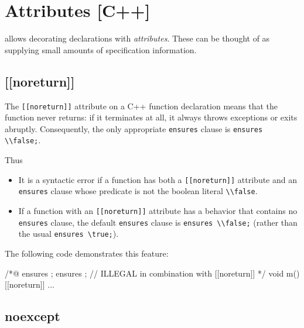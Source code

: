 \section{Attributes [C++]}
\label{sec:attributes}

\experimental

\lang allows decorating declarations with \textit{attributes}. 
These can be thought of as supplying small amounts of specification information.

\subsection{[[noreturn]]}
\label{sec:noreturn}

The \lstinline|[[noreturn]]| attribute on a C++ function declaration means
that the function never returns: if it terminates at all, it always throws 
exceptions or exits abruptly. Consequently, the only appropriate \lstinline|ensures| clause
is \lstinline|ensures \\false;|.

Thus
\begin{itemize}
\item It is a syntactic error if a function has both a \lstinline|[[noreturn]]|
attribute and an \lstinline|ensures| clause whose predicate is not the 
boolean literal \lstinline|\\false|.
\item If a function with an \lstinline|[[noreturn]]| attribute has a behavior
that contains no \lstinline|ensures| clause, the default \lstinline|ensures|
clause is \lstinline|ensures \\false;| (rather than the usual \lstinline|ensures \true;|).
\end{itemize}

The following code demonstrates this feature:
\begin{example}
\begin{listing-nonumber}
/*@
ensures \false;
ensures \true; // ILLEGAL in combination with [[noreturn]]
*/
void m() [[noreturn]] { ... }
\end{listing-nonumber}
\end{example}


\subsection{noexcept}
\label{sec:noexcept}

